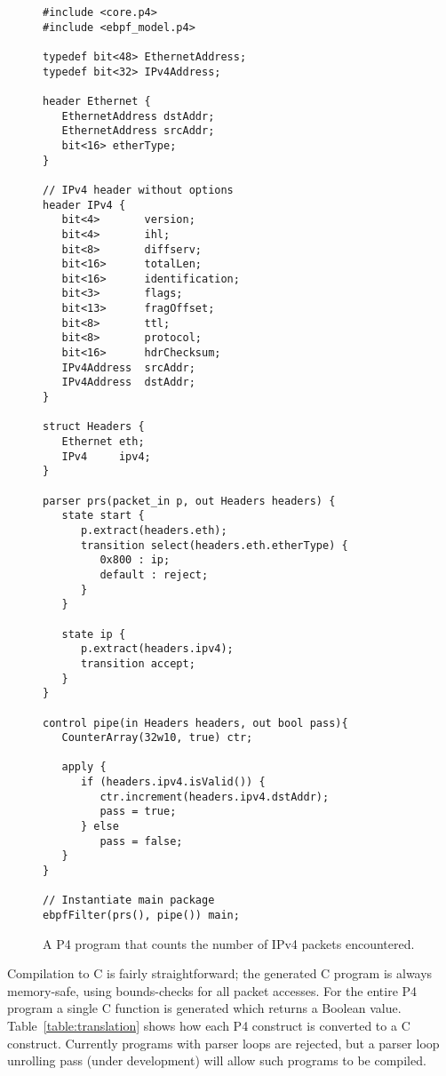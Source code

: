 \begin{figure}
\begin{lstlisting}
#include <core.p4>
#include <ebpf_model.p4>

typedef bit<48> EthernetAddress;
typedef bit<32> IPv4Address;

header Ethernet {
   EthernetAddress dstAddr;
   EthernetAddress srcAddr;
   bit<16> etherType;
}

// IPv4 header without options
header IPv4 {
   bit<4>       version;
   bit<4>       ihl;
   bit<8>       diffserv;
   bit<16>      totalLen;
   bit<16>      identification;
   bit<3>       flags;
   bit<13>      fragOffset;
   bit<8>       ttl;
   bit<8>       protocol;
   bit<16>      hdrChecksum;
   IPv4Address  srcAddr;
   IPv4Address  dstAddr;
}

struct Headers {
   Ethernet eth;
   IPv4     ipv4;
}

parser prs(packet_in p, out Headers headers) {
   state start {
      p.extract(headers.eth);
      transition select(headers.eth.etherType) {
         0x800 : ip;
         default : reject;
      }
   }

   state ip {
      p.extract(headers.ipv4);
      transition accept;
   }
}

control pipe(in Headers headers, out bool pass){
   CounterArray(32w10, true) ctr;

   apply {
      if (headers.ipv4.isValid()) {
         ctr.increment(headers.ipv4.dstAddr);
         pass = true;
      } else
         pass = false;
   }
}

// Instantiate main package
ebpfFilter(prs(), pipe()) main;
\end{lstlisting}
\caption{A P4 program that counts the number of IPv4 packets
  encountered.}\label{fig:count}
\end{figure}

Compilation to C is fairly straightforward; the generated C program is
always memory-safe, using bounds-checks for all packet accesses.  For
the entire P4 program a single C function is generated which returns a
Boolean value.  Table~\ref{table:translation} shows how each P4
construct is converted to a C construct.  Currently programs with
parser loops are rejected, but a parser loop unrolling pass (under
development) will allow such programs to be compiled.

